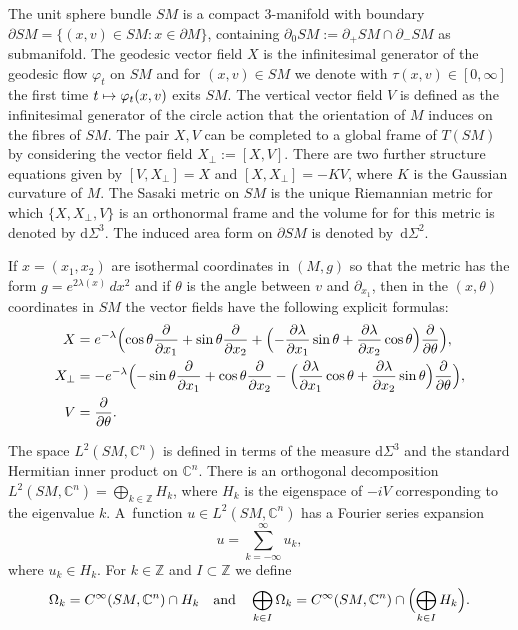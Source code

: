 \documentclass[JEP,XML,SOM,Unicode,published]{cedram}
\newcommand\mto{\mathchoice{\longmapsto}{\mapsto}{\mapsto}{\mapsto}}
\theoremstyle{plain}
\theoremstyle{definition}
\newcommand{\Z}{\mathbb{Z}}
\newcommand{\C}{\mathbb{C}}
\renewcommand{\d}{\mathrm{d}}
\newcommand{\1}{{\bf 1}}
\begin{document}
The unit sphere bundle $SM$ is a compact $3$-manifold with boundary $\partial SM=\{(x,v)\in SM:x\in \partial M\}$, containing $\partial_0SM:=\partial_+SM\cap \partial_-SM$ as submanifold. The geodesic vector field $X$ is the infinitesimal generator of the geodesic flow $\varphi_t$ on $SM$ and for $(x,v)\in SM$ we denote with $\tau(x,v)\in[0,\infty]$ the first time $t\mto \varphi_t(x,v)$ exits $SM$.
The vertical vector field $V$ is defined as the infinitesimal generator of the circle action that the orientation of $M$ induces on the fibres of $SM$. The pair $X,V$ can be completed to a global frame of $T(SM)$ by considering the vector field $X_\perp:=[X,V]$. There are two further structure equations given by $[V,X_\perp]=X$ and $[X,X_\perp]=-KV$, where $K$ is the Gaussian curvature of $M$. The Sasaki metric on $SM$ is the unique Riemannian metric for which $\{X,X_\perp,V\}$ is an orthonormal frame and the volume for for this metric is denoted by $\d\Sigma^3$. The induced area form on $\partial SM$ is denoted by~$\d\Sigma^2$.

If $x = (x_1, x_2)$ are isothermal coordinates in $(M,g)$ so that the metric has the form $g = e^{2\lambda(x)} \,dx^2$ and if $\theta$ is the angle between $v$ and $\partial_{x_1}$, then in the $(x,\theta)$ coordinates in $SM$ the vector fields have the following explicit formulas:
\begin{align}
X &= e^{-\lambda}\Bigl(\cos\theta\frac{\partial}{\partial x_{1}}+
\sin\theta\frac{\partial}{\partial x_{2}}+
\Bigl(-\frac{\partial \lambda}{\partial x_{1}}\sin\theta+\frac{\partial\lambda}{\partial x_{2}}\cos\theta\Bigr)\frac{\partial}{\partial \theta}\Bigr), \label{defX}\\
X_{\perp} &= -e^{-\lambda}\Bigl(-\sin\theta\frac{\partial}{\partial x_{1}}+
\cos\theta\frac{\partial}{\partial x_{2}}-
\Bigl(\frac{\partial \lambda}{\partial x_{1}}\cos\theta+\frac{\partial \lambda}{\partial x_{2}}\sin\theta\Bigr)\frac{\partial}{\partial \theta}\Bigr), \notag\\
V &= \frac{\partial}{\partial\theta}.\notag
\end{align}

The space $L^2(SM,\C^n)$ is defined in terms of the measure $\d \Sigma^3$ and the standard Hermitian inner product on $\C^n$. There is an orthogonal decomposition $L^{2}(SM,\C^n)=\bigoplus_{k\in\mathbb Z}H_{k}$, where $H_k$ is the eigenspace of $-iV$ corresponding to the eigenvalue $k$. A~function $u\in L^{2}(SM,\C^n)$ has a Fourier series expansion
\begin{equation*} u=\sum_{k=-\infty}^{\infty}u_{k},\end{equation*}
where $u_{k}\in H_k$. For $k\in \Z$ and $I\subset \Z$ we define
\begin{equation}\label{defOmega}
\Omega_{k}=C^{\infty}(SM,\C^n)\cap H_{k}\quad \text{and}\quad \bigoplus_{k\in I}\Omega_k = C^\infty(SM,\C^n)\cap \Bigl( \bigoplus_{k\in I}H_k \Bigr).
\end{equation}
\end{document}
